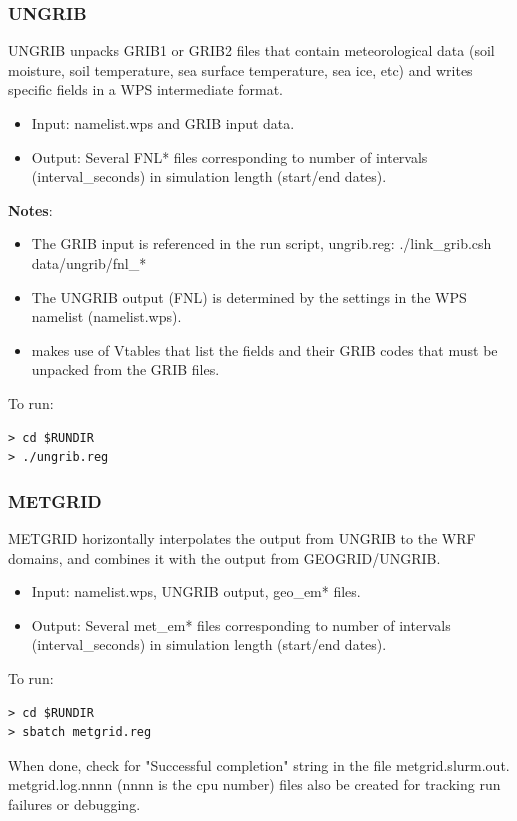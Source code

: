 \begin{frame}[fragile]\frametitle{UNGRIB}

\scriptsize{
UNGRIB unpacks GRIB1 or GRIB2 files that contain  meteorological data (soil moisture, soil temperature, sea surface temperature, sea ice, etc) and writes specific fields in a WPS intermediate format.
\begin{itemize}
\item Input: namelist.wps  and GRIB input data.
\item Output: Several FNL* files corresponding to number of intervals (interval\_seconds) in simulation length (start/end dates).
\end{itemize}}
\scriptsize{\textbf{Notes}: 
\begin{itemize}
\item The GRIB input is referenced in the run script, ungrib.reg:
      ./link\_grib.csh data/ungrib/fnl\_*\\
\item The UNGRIB output (FNL) is determined by the settings in the WPS namelist (namelist.wps).
\item makes use of Vtables that list the fields and their GRIB codes that must be unpacked from the GRIB files.
\end{itemize}
}
\hrulefill\par
\scriptsize{To run:}
\verbatimfont{\scriptsize}%
\begin{verbatim}
> cd $RUNDIR
> ./ungrib.reg
\end{verbatim}

\end{frame}

\begin{frame}[fragile]\frametitle{METGRID}

\footnotesize{
METGRID horizontally interpolates the output from UNGRIB to the WRF domains, and combines it with the
output from GEOGRID/UNGRIB.
\begin{itemize}
\item Input: namelist.wps, UNGRIB output, geo\_em* files.
\item Output: Several met\_em* files corresponding to number of intervals (interval\_seconds) in simulation length (start/end dates).
\end{itemize}
}    
\hrulefill\par
\footnotesize{To run:}
\begin{lstlisting}
> cd $RUNDIR
> sbatch metgrid.reg
\end{lstlisting}
When done, check for  "Successful completion" string in the file metgrid.slurm.out. metgrid.log.nnnn (nnnn is the cpu number) files also be created for tracking run failures or debugging.


\end{frame}

